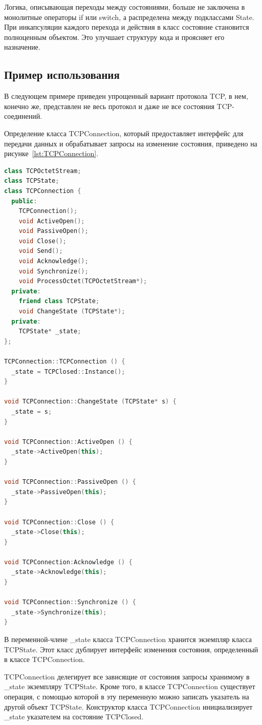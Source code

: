 Логика, описывающая переходы между состояниями, больше не заключена
в монолитные операторы if или switch, а распределена между подклассами State.
При инкапсуляции каждого перехода и действия в класс состояние
становится полноценным объектом. Это улучшает структуру кода и проясняет его назначение.

\subsection{Пример использования}

В следующем примере приведен упрощенный вариант протокола TCP, в нем, конечно же,
представлен не весь протокол и даже не все состояния TCP-соединений.

Определение класса TCPConnection, который предоставляет интерфейс
для передачи данных и обрабатывает запросы на изменение состояния,
приведено на рисунке~\ref{lst:TCPConnection}.

\begin{lstlisting}[language=c++,caption=Класс TCPConnection,label=lst:TCPConnection]
class TCPOctetStream;
class TCPState;
class TCPConnection {
  public:
    TCPConnection();
    void ActiveOpen();
    void PassiveOpen();
    void Close();
    void Send();
    void Acknowledge();
    void Synchronize();
    void ProcessOctet(TCPOctetStream*);
  private:
    friend class TCPState;
    void ChangeState (TCPState*);
  private:
    TCPState* _state;
};

TCPConnection::TCPConnection () {
  _state = TCPClosed::Instance();
}

void TCPConnection::ChangeState (TCPState* s) {
  _state = s;
}

void TCPConnection::ActiveOpen () {
  _state->ActiveOpen(this);
}

void TCPConnection::PassiveOpen () {
  _state->PassiveOpen(this);
}

void TCPConnection::Close () {
  _state->Close(this);
}

void TCPConnection:Acknowledge () {
  _state->Acknowledge(this);
}

void TCPConnection::Synchronize () {
  _state->Synchronize(this);
}
\end{lstlisting}

В переменной-члене \_state класса TCPConnection хранится экземпляр
класса TCPState. Этот класс дублирует интерфейс изменения состояния,
определенный в классе TCPConnection.

TCPConnection делегирует все зависящие от состояния запросы хранимому
в \_state экземпляру TCPState. Кроме того, в классе TCPConnection существует
операция, с помощью которой в эту переменную можно записать указатель на
другой объект TCPState. Конструктор класса TCPConnection инициализирует
\_state указателем на состояние TCPClosed.

